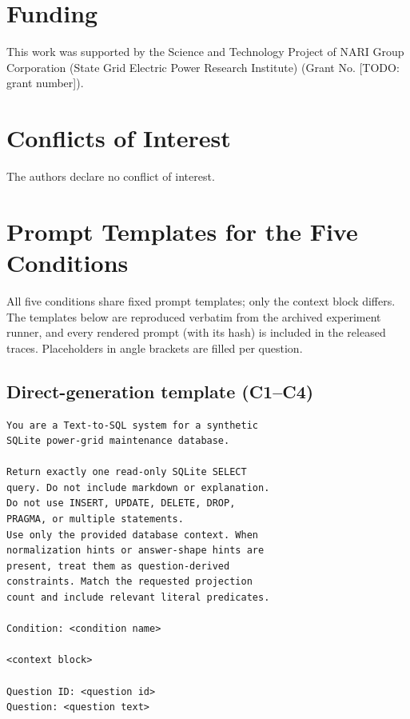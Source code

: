\documentclass{ieeeaccess}
\begin{document}
\section*{Funding}

This work was supported by the Science and Technology Project of NARI Group Corporation (State Grid Electric Power Research Institute) (Grant No. [TODO: grant number]).

\section*{Conflicts of Interest}

The authors declare no conflict of interest.

\appendices

\section{Prompt Templates for the Five Conditions}\label{appendix-prompts}

All five conditions share fixed prompt templates; only the context block differs. The templates below are reproduced verbatim from the archived experiment runner, and every rendered prompt (with its hash) is included in the released traces. Placeholders in angle brackets are filled per question.

\subsection{Direct-generation template (C1--C4)}

\begin{small}
\begin{verbatim}
You are a Text-to-SQL system for a synthetic
SQLite power-grid maintenance database.

Return exactly one read-only SQLite SELECT
query. Do not include markdown or explanation.
Do not use INSERT, UPDATE, DELETE, DROP,
PRAGMA, or multiple statements.
Use only the provided database context. When
normalization hints or answer-shape hints are
present, treat them as question-derived
constraints. Match the requested projection
count and include relevant literal predicates.

Condition: <condition name>

<context block>

Question ID: <question id>
Question: <question text>
\end{verbatim}
\end{small}
\end{document}
